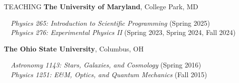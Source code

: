 \documentclass{resume} %
\begin{document}
\begin{rSection}{TEACHING}
{\bf The University of Maryland}, College Park, MD

\-\ \-\ \textit{Physics 265: Introduction to Scientific Programming} (Spring 2025) \\
\-\ \-\ \textit{Physics 276: Experimental Physics II} (Spring 2023, Spring 2024, Fall 2024)

{\bf The Ohio State University}, Columbus, OH 

\-\ \-\ \textit{Astronomy 1143: Stars, Galaxies, and Cosmology} (Spring 2016) \\
\-\ \-\ \textit{Physics 1251: E\&M, Optics, and Quantum Mechanics} (Fall 2015)




\end{rSection}
\newpage

\end{document}
